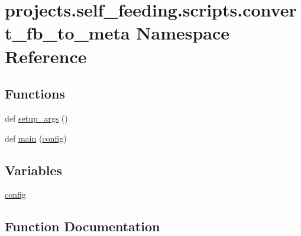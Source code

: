 \hypertarget{namespaceprojects_1_1self__feeding_1_1scripts_1_1convert__fb__to__meta}{}\section{projects.\+self\+\_\+feeding.\+scripts.\+convert\+\_\+fb\+\_\+to\+\_\+meta Namespace Reference}
\label{namespaceprojects_1_1self__feeding_1_1scripts_1_1convert__fb__to__meta}
\subsection*{Functions}
\begin{DoxyCompactItemize}
\item 
def \hyperlink{namespaceprojects_1_1self__feeding_1_1scripts_1_1convert__fb__to__meta_a4e7b9af677e57ec059b5011985d1ad87}{setup\+\_\+args} ()
\item 
def \hyperlink{namespaceprojects_1_1self__feeding_1_1scripts_1_1convert__fb__to__meta_ab61505eb662980f495ad77fc2f48e76c}{main} (\hyperlink{namespaceprojects_1_1self__feeding_1_1scripts_1_1convert__fb__to__meta_a924802bd0174014857610ec9a1485900}{config})
\end{DoxyCompactItemize}
\subsection*{Variables}
\begin{DoxyCompactItemize}
\item 
\hyperlink{namespaceprojects_1_1self__feeding_1_1scripts_1_1convert__fb__to__meta_a924802bd0174014857610ec9a1485900}{config}
\end{DoxyCompactItemize}


\subsection{Function Documentation}
\mbox{\label{namespaceprojects_1_1self__feeding_1_1scripts_1_1convert__fb__to__meta_ab61505eb662980f495ad77fc2f48e76c}} 
